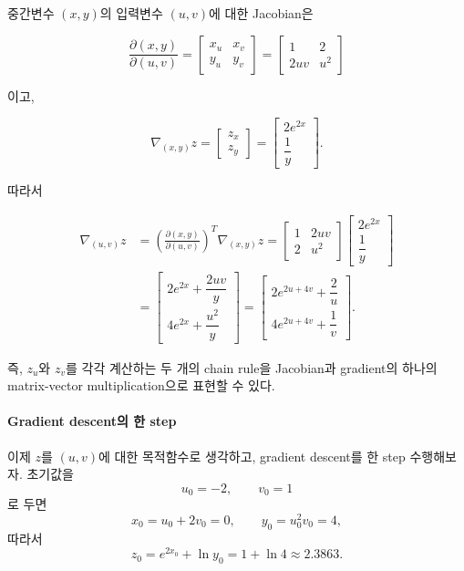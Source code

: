 \documentclass[11pt,a4paper]{article}
\begin{document}
중간변수 $(x,y)$의 입력변수 $(u,v)$에 대한 Jacobian은

\[
\frac{\partial(x,y)}{\partial(u,v)}
=
\begin{bmatrix}
x_u & x_v\\
y_u & y_v
\end{bmatrix}
=
\begin{bmatrix}
1 & 2\\
2uv & u^2
\end{bmatrix}
\]

이고,

\[
\nabla_{(x,y)}z
=
\begin{bmatrix}
z_x\\
z_y
\end{bmatrix}
=
\begin{bmatrix}
2e^{2x}\\[0.4em]
\dfrac{1}{y}
\end{bmatrix}.
\]

따라서

\[
\begin{aligned}
\nabla_{(u,v)}z
&=
\left(
\frac{\partial(x,y)}{\partial(u,v)}
\right)^T
\nabla_{(x,y)}z
=
\begin{bmatrix}
1 & 2uv\\
2 & u^2
\end{bmatrix}
\begin{bmatrix}
2e^{2x}\\[0.4em]
\dfrac{1}{y}
\end{bmatrix}
\\[0.5em]
&=
\begin{bmatrix}
2e^{2x}+\dfrac{2uv}{y}\\[0.8em]
4e^{2x}+\dfrac{u^2}{y}
\end{bmatrix}
=
\begin{bmatrix}
2e^{2u+4v}+\dfrac{2}{u}\\[0.8em]
4e^{2u+4v}+\dfrac{1}{v}
\end{bmatrix}.
\end{aligned}
\]

즉, $z_u$와 $z_v$를 각각 계산하는 두 개의 chain rule을
Jacobian과 gradient의 하나의 matrix-vector multiplication으로
표현할 수 있다.

\paragraph{Gradient descent의 한 step}

이제 $z$를 $(u,v)$에 대한 목적함수로 생각하고,
gradient descent를 한 step 수행해보자.
초기값을
\[
u_0=-2,\qquad v_0=1
\]
로 두면
\[
x_0=u_0+2v_0=0,
\qquad
y_0=u_0^2v_0=4,
\]
따라서
\[
z_0=e^{2x_0}+\ln y_0
=1+\ln4
\approx2.3863.
\]
\end{document}
